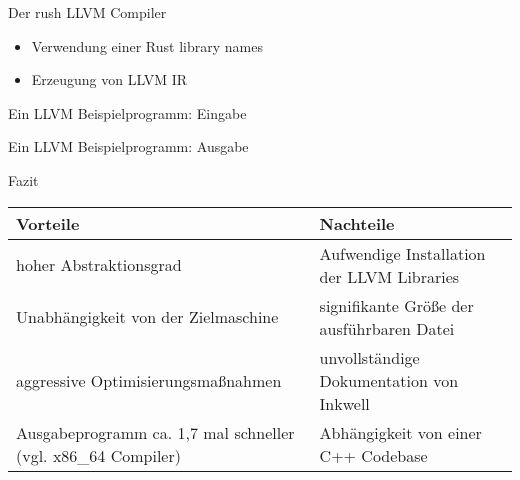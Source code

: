 \begin{frame}{Der rush LLVM Compiler}
	\begin{itemize}
		\item Verwendung einer Rust library names 
		\item Erzeugung von LLVM IR
	\end{itemize}
\end{frame}

\begin{frame}{Ein LLVM Beispielprogramm: Eingabe}
\end{frame}

\begin{frame}{Ein LLVM Beispielprogramm: Ausgabe}
\end{frame}

\begin{frame}{Fazit}
	\begin{table}[h]
		\begin{tabularx}{0.95\textwidth}{L|L}
			 Vorteile                                 &  Nachteile               \\
            \hline
			hoher Abstraktionsgrad                                        & Aufwendige Installation der LLVM Libraries \\
			Unabhängigkeit von der Zielmaschine                           & signifikante Größe der ausführbaren Datei  \\
			aggressive Optimisierungsmaßnahmen                            & unvollständige Dokumentation von Inkwell   \\
			Ausgabeprogramm ca. 1,7 mal schneller (vgl. x86\_64 Compiler) & Abhängigkeit von einer C++ Codebase        \\
		\end{tabularx}
	\end{table}
\end{frame}
